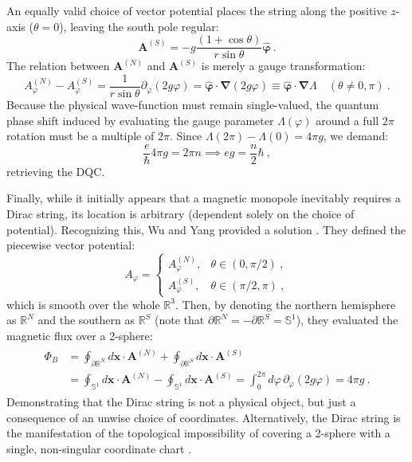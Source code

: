\documentclass[a4paper,11pt]{article}
\begin{document}
 An equally valid choice of vector potential places the string along the positive $z$-axis ($\theta=0$), leaving the south pole regular:
 \begin{equation}
    \boldsymbol{A}^{(S)} = - g \frac{(1 + \cos\theta)}{r\sin\theta} \hat{\boldsymbol \varphi}\ .
 \end{equation}
 The relation between $\boldsymbol{A}^{(N)}$ and $\boldsymbol{A}^{(S)}$ is merely a gauge transformation:
 \begin{equation}
    A^{(N)}_\varphi - A^{(S)}_\varphi = \frac{1}{r\sin\theta} \partial_\varphi (2g\varphi) = \hat{\boldsymbol \varphi} \cdot \boldsymbol{\nabla}(2g\varphi)\equiv \hat{\boldsymbol \varphi} \cdot \boldsymbol{\nabla}\Lambda  \quad (\theta \neq 0, \pi)\ .
 \end{equation}
Because the physical wave-function must remain single-valued, the quantum phase shift induced by evaluating the gauge parameter $\Lambda(\varphi)$ around a full $2\pi$ rotation must be a multiple of $2\pi$. Since $\Lambda(2\pi) - \Lambda(0) = 4\pi g$, we demand:
 \begin{equation}
    \frac{e}{\hbar} 4\pi g = 2\pi n \implies eg = \frac{n}{2} \hbar\ ,
 \end{equation}
 retrieving the DQC.
 
 Finally, while it initially appears that a magnetic monopole inevitably requires a Dirac string, its location is arbitrary (dependent solely on the choice of potential). Recognizing this, Wu and Yang provided a solution \cite{WuYang1975}. They defined the piecewise vector potential:
 \begin{equation}
    A_\varphi = \begin{cases} A_\varphi^{(N)}, &  \theta \in (0, \pi/2)\ , \\ A_\varphi^{(S)}, &  \theta \in (\pi/2, \pi) \ ,\end{cases}
 \end{equation}
 which is smooth over the whole $\mathbb R^3$. Then, by denoting the northern hemisphere as $\mathbb R^N$ and the southern as $\mathbb R^S$ (note that $\partial \mathbb R^N=-\partial \mathbb R^S=\mathbb S^1$), they evaluated the magnetic flux over a 2-sphere:
 \begin{align}
    \begin{split}
        \Phi_B &= \oint_{\partial \mathbb R^N} d\boldsymbol{x} \cdot \boldsymbol{A}^{(N)} + \oint_{\partial \mathbb R^S} d\boldsymbol{x} \cdot \boldsymbol{A}^{(S)}\\
        &= \oint_{\mathbb S^1} d\boldsymbol{x} \cdot \boldsymbol{A}^{(N)} - \oint_{\mathbb S^1} d\boldsymbol{x} \cdot \boldsymbol{A}^{(S)} = \int_0^{2\pi} d\varphi \, \partial_\varphi (2g\varphi) = 4\pi g\ .
    \end{split}
 \end{align}
Demonstrating that the Dirac string is not a physical object, but just a consequence of an unwise choice of coordinates. Alternatively, the Dirac string is the manifestation of the topological impossibility of covering a 2-sphere with a single, non-singular coordinate chart \cite{Nakahara2003}.
\end{document}

